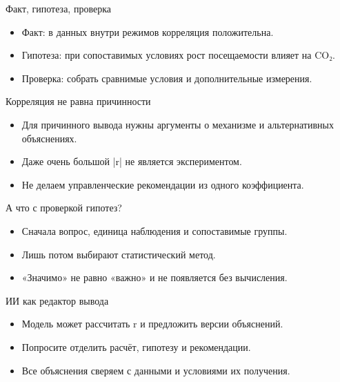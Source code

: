 \documentclass[aspectratio=169,10pt]{beamer}
\begin{document}
\begin{frame}[t]{Факт, гипотеза, проверка}
\vspace{.15cm}\begin{itemize}
\item Факт: в данных внутри режимов корреляция положительна.\vspace{6pt}
\item Гипотеза: при сопоставимых условиях рост посещаемости влияет на CO₂.\vspace{6pt}
\item Проверка: собрать сравнимые условия и дополнительные измерения.\vspace{6pt}
\end{itemize}
\end{frame}
\begin{frame}[t]{Корреляция не равна причинности}
\vspace{.15cm}\begin{itemize}
\item Для причинного вывода нужны аргументы о механизме и альтернативных объяснениях.\vspace{6pt}
\item Даже очень большой |r| не является экспериментом.\vspace{6pt}
\item Не делаем управленческие рекомендации из одного коэффициента.\vspace{6pt}
\end{itemize}
\end{frame}
\begin{frame}[t]{А что с проверкой гипотез?}
\vspace{.15cm}\begin{itemize}
\item Сначала вопрос, единица наблюдения и сопоставимые группы.\vspace{6pt}
\item Лишь потом выбирают статистический метод.\vspace{6pt}
\item «Значимо» не равно «важно» и не появляется без вычисления.\vspace{6pt}
\end{itemize}
\end{frame}
\begin{frame}[t]{ИИ как редактор вывода}
\vspace{.15cm}\begin{itemize}
\item Модель может рассчитать r и предложить версии объяснений.\vspace{6pt}
\item Попросите отделить расчёт, гипотезу и рекомендации.\vspace{6pt}
\item Все объяснения сверяем с данными и условиями их получения.\vspace{6pt}
\end{itemize}
\end{frame}
\end{document}
